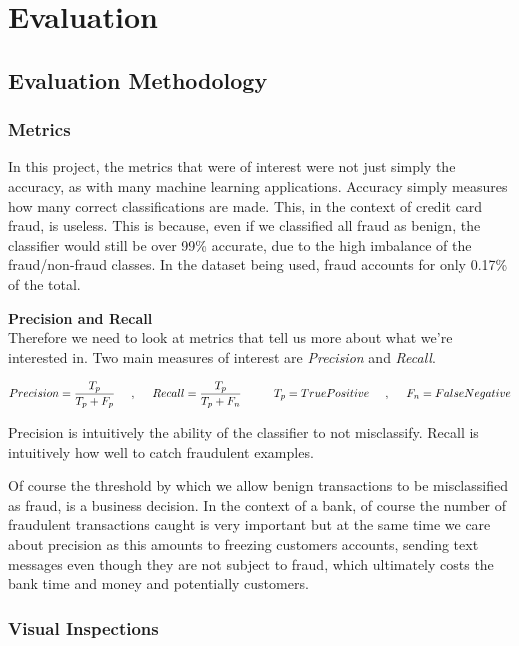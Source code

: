 \documentclass[12pt,a4paper,twoside]{report}
\begin{document}
\chapter{Evaluation}
\section{Evaluation Methodology}
\subsection{Metrics}
In this project, the metrics that were of interest were not just simply the accuracy, as with many machine learning applications. Accuracy simply measures how many correct classifications are made. This, in the context of credit card fraud, is useless. This is because, even if we classified all fraud as benign, the classifier would still be over 99\% accurate, due to the high imbalance of the fraud/non-fraud classes. In the dataset being used, fraud accounts for only 0.17\% of the total. 

\textbf{Precision and Recall}\\

Therefore we need to look at metrics that tell us more about what we're interested in. Two main measures of interest are \textit{Precision} and \textit{Recall}.

\[
    {Precision} = \frac{T_p}{T_p+F_p} \hspace{5mm} , \hspace{5mm} {Recall} = \frac{T_p}{T_p+F_n} \hspace{1cm}  {T_p} = {True Positive} \hspace{5mm},\hspace{5mm} {F_n} = {False Negative}
\]

Precision is intuitively the ability of the classifier to not misclassify. Recall is intuitively how well to catch fraudulent examples. 

Of course the threshold by which we allow benign transactions to be misclassified as fraud, is a business decision. In the context of a bank, of course the number of fraudulent transactions caught is very important but at the same time we care about precision as this amounts to freezing customers accounts, sending text messages even though they are not subject to fraud, which ultimately costs the bank time and money and potentially customers.

\subsection{Visual Inspections}
\end{document}
